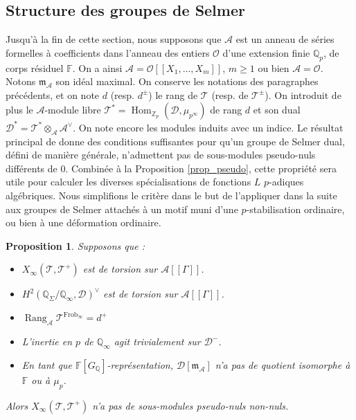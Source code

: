 \documentclass[12pt]{amsart}
\newcommand\bQ{\mathbb{Q}}
\newcommand\bF{\mathbb{F}}
\newcommand\Zp{{\mathbb{Z}_{p}}}
\newcommand\Qp{\mathbb{Q}_{p}}
\newcommand\cA{\mathcal{A}}
\newcommand\cD{\mathcal{D}}
\newcommand\cO{\mathcal{O}}
\newcommand\cT{\mathcal{T}}
\newcommand\gm{\mathfrak{m}}
\DeclareMathOperator{\Hom}{Hom}
\DeclareMathOperator{\rg}{Rang}
\DeclareMathOperator{\Frob}{Frob}
\theoremstyle{defstyle}
\theoremstyle{thmstyle}
\newtheorem{proposition}[subsubsection]{Proposition}
\begin{document}
\subsection{Structure des groupes de Selmer}
\label{sec:structure_selmer}
Jusqu'à la fin de cette section, nous supposons que $\cA$ est un anneau de séries formelles à coefficients  dans l'anneau des entiers $\cO$ d'une extension finie $\Qp$, de corps résiduel $\bF$. On a ainsi $\cA=\cO[[X_1,\ldots,X_m]]$, $m\geq 1$ ou bien $\cA=\cO$. Notons $\gm_{\cA}$ son idéal maximal. On conserve les notations des paragraphes précédents, et on note $d$ (resp. $d^\pm$) le rang de $\cT$ (resp. de $\cT^\pm$). On introduit de plus le $\cA$-module libre $\cT^*=\Hom_\Zp(\cD,\mu_{p^\infty})$ de rang $d$ et son dual $\cD^*=\cT^* \otimes_{\cA} {\cA}^\vee$. On note encore les modules induits avec un indice. Le résultat principal de \cite{greenberg2015structure} donne des conditions suffisantes pour qu'un groupe de Selmer dual, défini de manière générale, n'admettent pas de sous-modules pseudo-nuls différents de 0. Combinée à la Proposition \ref{prop_pseudo}, cette propriété sera utile pour calculer les diverses spécialisations de fonctions $L$ $p$-adiques algébriques. Nous simplifions le critère dans le but de l'appliquer dans la suite aux groupes de Selmer attachés à un motif muni d'une $p$-stabilisation ordinaire, ou bien à une déformation ordinaire. 

\begin{proposition}\label{PsN}
	Supposons que : 
	\begin{itemize}
		\item[(a)] $X_\infty(\cT,\cT^+)$ est de torsion sur $\cA[[\Gamma]]$.
		\item[(b)] $H^2(\bQ_\Sigma/\bQ_\infty,\cD)^\vee$ est de torsion sur $\cA[[\Gamma]]$.
		\item[(c)] $\rg_{\cA} \cT^{\Frob_\infty}=d^+$
		\item[(d)] L'inertie en $p$ de $\bQ_\infty$ agit trivialement sur $\cD^-$.
		\item[(e)] En tant que $\bF[G_\bQ]$-représentation, $\cD[\gm_{\cA}]$ n'a pas de quotient isomorphe à $\bF$ ou à $\mu_p$.
	\end{itemize}
	Alors $X_\infty(\cT,\cT^+)$ n'a pas de sous-modules pseudo-nuls non-nuls.
\end{proposition}
\end{document}

